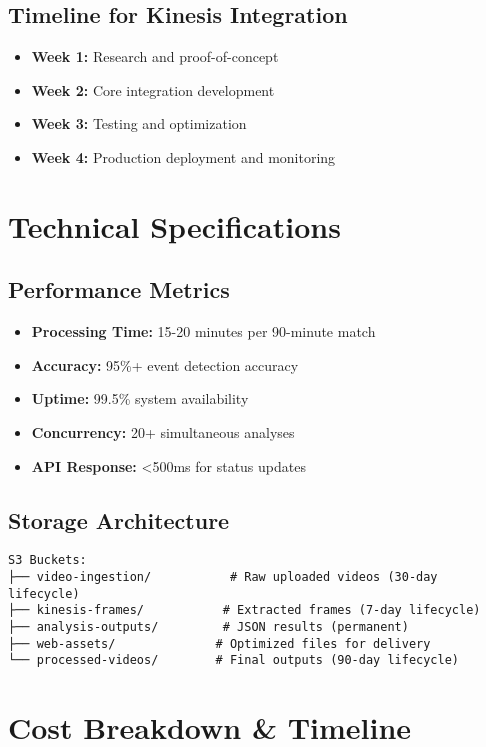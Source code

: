 \documentclass[11pt,a4paper]{article}
\begin{document}
\subsection{Timeline for Kinesis Integration}
\begin{itemize}[leftmargin=1.5cm]
    \item \textbf{Week 1:} Research and proof-of-concept
    \item \textbf{Week 2:} Core integration development
    \item \textbf{Week 3:} Testing and optimization
    \item \textbf{Week 4:} Production deployment and monitoring
\end{itemize}

\section{Technical Specifications}

\subsection{Performance Metrics}
\begin{itemize}[leftmargin=1.5cm]
    \item \textbf{Processing Time:} 15-20 minutes per 90-minute match
    \item \textbf{Accuracy:} 95\%+ event detection accuracy
    \item \textbf{Uptime:} 99.5\% system availability
    \item \textbf{Concurrency:} 20+ simultaneous analyses
    \item \textbf{API Response:} <500ms for status updates
\end{itemize}

\subsection{Storage Architecture}
\begin{verbatim}
S3 Buckets:
├── video-ingestion/           # Raw uploaded videos (30-day lifecycle)
├── kinesis-frames/           # Extracted frames (7-day lifecycle)
├── analysis-outputs/         # JSON results (permanent)
├── web-assets/              # Optimized files for delivery
└── processed-videos/        # Final outputs (90-day lifecycle)
\end{verbatim}

\section{Cost Breakdown \& Timeline}
\end{document}
